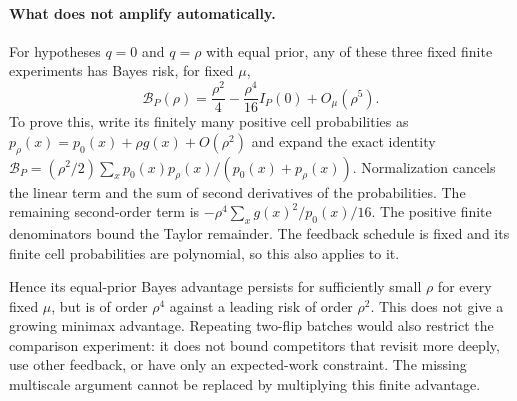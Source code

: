\paragraph{What does not amplify automatically.}
For hypotheses $q=0$ and $q=\rho$ with equal prior, any of these three
fixed finite experiments has Bayes risk, for fixed $\mu$,
\[
 \mathcal B_P(\rho)
 =\frac{\rho^2}{4}-\frac{\rho^4}{16}I_P(0)+O_\mu(\rho^5).
\]
To prove this, write its finitely many positive cell probabilities as
$p_\rho(x)=p_0(x)+\rho g(x)+O(\rho^2)$ and expand the exact identity
$\mathcal B_P=(\rho^2/2)\sum_xp_0(x)p_\rho(x)/(p_0(x)+p_\rho(x))$.
Normalization cancels the linear term and the sum of second derivatives
of the probabilities. The remaining second-order term is
$-\rho^4\sum_x g(x)^2/p_0(x)/16$.
The positive finite denominators bound the Taylor remainder. The feedback
schedule is fixed and its finite cell probabilities are polynomial, so
this also applies to it.

Hence its equal-prior Bayes advantage persists for sufficiently small
$\rho$ for every fixed $\mu$, but is of order $\rho^4$ against a leading
risk of order $\rho^2$. This does not give a growing minimax advantage.
Repeating two-flip batches would also restrict the comparison experiment:
it does not bound competitors that revisit more deeply, use other feedback,
or have only an expected-work constraint. The missing multiscale argument
cannot be replaced by multiplying this finite advantage.
